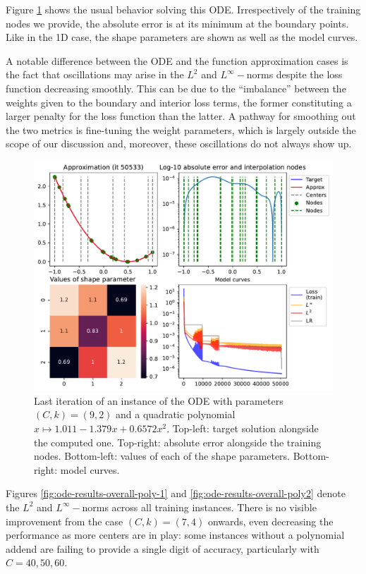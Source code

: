 \documentclass[12pt]{report} %
\begin{document}
Figure \ref{fig:ode-1d-example-training} shows the usual behavior solving this ODE. Irrespectively of the training nodes we provide, the absolute error is at its minimum at the boundary points. Like in the 1D case, the shape parameters are shown as well as the model curves. 

A notable difference between the ODE and the function approximation cases is the fact that oscillations may arise in the $L^2$ and $L^\infty-$norms despite the loss function decreasing smoothly. This can be due to the ``imbalance'' between the weights given to the boundary and interior loss terms, the former constituting a larger penalty for the loss function than the latter. A pathway for smoothing out the two metrics is fine-tuning the weight parameters, which is largely outside the scope of our discussion and, moreover, these oscillations do not always show up.

\begin{figure}[h]
  \includegraphics[width=\textwidth]{imagenes/experiments/1d/ode/TR18-C9-Kgaussian_kernel-Poly2-Sh1.25-15.csv-E50533.pdf}
  \caption{Last iteration of an instance of the ODE with parameters $(C,k)=(9,2)$ and a quadratic polynomial $x\mapsto 1.011-1.379x+0.6572x^2$. Top-left: target solution alongside the computed one. Top-right: absolute error alongside the training nodes. Bottom-left: values of each of the shape parameters. Bottom-right: model curves.}
  \label{fig:ode-1d-example-training}
\end{figure}

Figures \ref{fig:ode-results-overall-poly-1} and \ref{fig:ode-results-overall-poly2} denote the $L^2$ and $L^\infty-$norms across all training instances. There is no visible improvement from the case $(C,k)=(7,4)$ onwards, even decreasing the performance as more centers are in play: some instances without a polynomial addend are failing to provide a single digit of accuracy, particularly with $C=40,50,60$.
\end{document}
